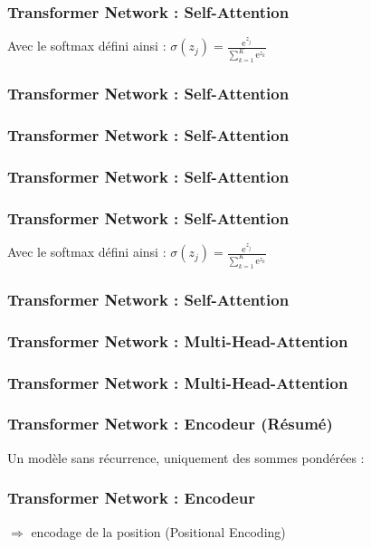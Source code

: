 \documentclass{formation}
\begin{document}
\begin{frame}
  \frametitle{Transformer Network : Self-Attention}
  Avec le softmax défini ainsi : $\sigma(z_j)=\frac {\mathrm{e}^{z_j}}{\sum _{k=1}^{K}\mathrm{e}^{z_{k}}}$
\end{frame}

\begin{frame}
  \frametitle{Transformer Network : Self-Attention}
\end{frame}

\begin{frame}
  \frametitle{Transformer Network : Self-Attention}
\end{frame}

\begin{frame}
  \frametitle{Transformer Network : Self-Attention}
\end{frame}

\begin{frame}
  \frametitle{Transformer Network : Self-Attention}
  Avec le softmax défini ainsi : $\sigma(z_j)=\frac {\mathrm{e}^{z_j}}{\sum _{k=1}^{K}\mathrm{e}^{z_{k}}}$
\end{frame}

\begin{frame}
  \frametitle{Transformer Network : Self-Attention}
\end{frame}


\begin{frame}
  \frametitle{Transformer Network : Multi-Head-Attention}
\end{frame}

\begin{frame}
  \frametitle{Transformer Network : Multi-Head-Attention}
\end{frame}

\begin{frame}
  \frametitle{Transformer Network : Encodeur (Résumé)}
  Un modèle sans récurrence, uniquement des sommes pondérées : \\
\end{frame}

\begin{frame}
  \frametitle{Transformer Network : Encodeur}

  $\Rightarrow$ encodage de la position (Positional Encoding) \\
\end{frame}
\end{document}
